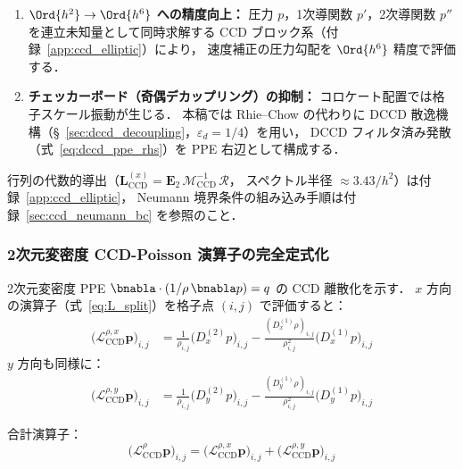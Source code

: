 \begin{enumerate}
  \item \textbf{$\Ord{h^2} \to \Ord{h^6}$ への精度向上：}
        圧力 $p$，1次導関数 $p'$，2次導関数 $p''$ を連立未知量として同時求解する
        CCD ブロック系（付録~\ref{app:ccd_elliptic}）により，
        速度補正の圧力勾配を $\Ord{h^6}$ 精度で評価する．
  \item \textbf{チェッカーボード（奇偶デカップリング）の抑制：}
        コロケート配置では格子スケール振動が生じる．
        本稿では Rhie--Chow の代わりに DCCD 散逸機構（§~\ref{sec:dccd_decoupling}，$\varepsilon_d=1/4$）を用い，
        DCCD フィルタ済み発散（式~\eqref{eq:dccd_ppe_rhs}）を PPE 右辺として構成する．
\end{enumerate}

行列の代数的導出（$\mathbf{L}_{\mathrm{CCD}}^{(x)} = \mathbf{E}_2\,\mathcal{M}_{\mathrm{CCD}}^{-1}\,\mathcal{R}$，
スペクトル半径 $\approx 3.43/h^2$）は付録~\ref{app:ccd_elliptic}，
Neumann 境界条件の組み込み手順は付録~\ref{sec:ccd_neumann_bc} を参照のこと．

\subsubsection{2次元変密度 CCD-Poisson 演算子の完全定式化}
\label{sec:ccd_2d_full}

2次元変密度 PPE $\bnabla\cdot(1/\rho\,\bnabla p) = q$ の CCD 離散化を示す．
$x$ 方向の演算子（式~\eqref{eq:L_split}）を格子点 $(i,j)$ で評価すると：
\begin{align}
  \bigl(\mathcal{L}_{\mathrm{CCD}}^{\rho,x}\bm{p}\bigr)_{i,j}
  &= \frac{1}{\rho_{i,j}}\bigl(D_x^{(2)} p\bigr)_{i,j}
  - \frac{(D_x^{(1)}\rho)_{i,j}}{\rho_{i,j}^2}\bigl(D_x^{(1)} p\bigr)_{i,j}
  \label{eq:Lx_varrho_discrete}
\end{align}
$y$ 方向も同様に：
\begin{align}
  \bigl(\mathcal{L}_{\mathrm{CCD}}^{\rho,y}\bm{p}\bigr)_{i,j}
  &= \frac{1}{\rho_{i,j}}\bigl(D_y^{(2)} p\bigr)_{i,j}
  - \frac{(D_y^{(1)}\rho)_{i,j}}{\rho_{i,j}^2}\bigl(D_y^{(1)} p\bigr)_{i,j}
  \label{eq:Ly_varrho_discrete}
\end{align}

合計演算子：
\begin{equation}
  \bigl(\mathcal{L}_{\mathrm{CCD}}^{\rho}\bm{p}\bigr)_{i,j}
  = \bigl(\mathcal{L}_{\mathrm{CCD}}^{\rho,x}\bm{p}\bigr)_{i,j}
  + \bigl(\mathcal{L}_{\mathrm{CCD}}^{\rho,y}\bm{p}\bigr)_{i,j}
  \label{eq:L_CCD_2d_full}
\end{equation}

